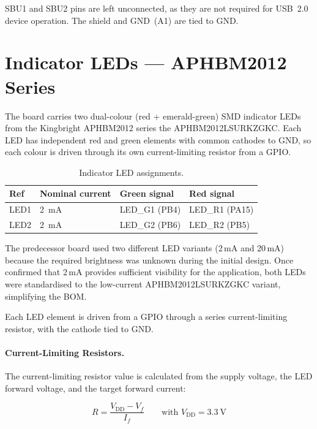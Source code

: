 SBU1 and SBU2 pins are left unconnected, as they are not required for USB~2.0 device
operation. The shield and GND~(A1) are tied to GND.

\section{Indicator LEDs --- APHBM2012 Series}
\label{sec:leds}

The board carries two dual-colour (red + emerald-green) SMD indicator LEDs from the
Kingbright APHBM2012 series the APHBM2012LSURKZGKC. Each LED has independent red and
green elements with common cathodes to GND, so each colour is driven through its own
current-limiting resistor from a GPIO.

\begin{table}[htbp]
  \centering
  \caption{Indicator LED assignments.}
  \label{tab:leds}
  \begin{tabular}{p{} p{} p{} p{}}
    \toprule
    Ref  & Nominal current         & Green signal     & Red signal       \\
    \midrule
    LED1 & \SI{2}{\milli\ampere}   & LED\_G1 (PB4)    & LED\_R1 (PA15)   \\
    LED2 & \SI{2}{\milli\ampere}   & LED\_G2 (PB6)    & LED\_R2 (PB5)    \\
    \bottomrule
  \end{tabular}
\end{table}

The predecessor board used two different LED variants (2\,mA and 20\,mA) because the
required brightness was unknown during the initial design. Once confirmed that 2\,mA
provides sufficient visibility for the application, both LEDs were standardised to the
low-current APHBM2012LSURKZGKC variant, simplifying the BOM.

Each LED element is driven from a GPIO through a series current-limiting resistor, with
the cathode tied to GND.

\paragraph{Current-Limiting Resistors.}
The current-limiting resistor value is calculated from the supply voltage, the LED forward
voltage, and the target forward current:

\begin{equation}
  R = \frac{V_\mathrm{DD} - V_f}{I_f} \qquad \text{with } V_\mathrm{DD} = \SI{3.3}{\volt}
  \label{eq:led-r}
\end{equation}

